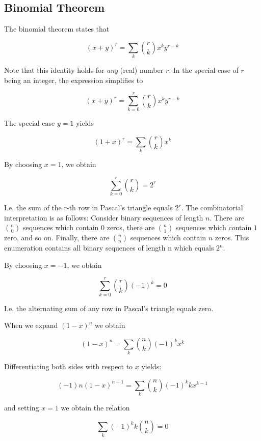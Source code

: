 \subsection{Binomial Theorem}

The binomial theorem states that

\[ (x+y)^r = \sum_k {r \choose k} x^k y^{r-k} \]

Note that this identity holds for \emph{any} (real) number $r$. In the special case of $r$ being an integer, the expression simplifies to

\[ (x+y)^r = \sum_{k=0}^r {r \choose k} x^k y^{r-k} \]

The special case $y = 1$ yields

\[ (1+x)^r = \sum_k {r \choose k} x^k \]

By choosing $x=1$, we obtain

\[ \sum_{k=0}^r {r \choose k} = 2^r \]

I.e. the sum of the r-th row in Pascal's triangle equals $2^r$. The combinatorial interpretation is as follows: Consider binary sequences of length $n$. There are ${n
\choose 0}$ sequences which contain $0$ zeros, there are ${n \choose 1}$ sequences which contain $1$ zero, and so on. Finally, there are ${n \choose n}$ sequences which contain $n$ zeros. This enumeration contains all binary sequences of length n which equals $2^n$.

By choosing $x=-1$, we obtain

\[ \sum_{k=0}^r {r \choose k} (-1)^k = 0 \]

I.e. the alternating sum of any row in Pascal's triangle equals zero.

When we expand \((1-x)^n\) we obtain

\[
(1-x)^n = \sum_k {n \choose k} (-1)^k x^k
\]

Differentiating both sides with respect to \(x\) yields:

\[
(-1)n(1-x)^{n-1} = \sum_k {n \choose k} (-1)^k k x^{k-1}
\]

and setting \(x=1\) we obtain the relation

\[
\sum_k (-1)^k k {n \choose k} = 0
\]
